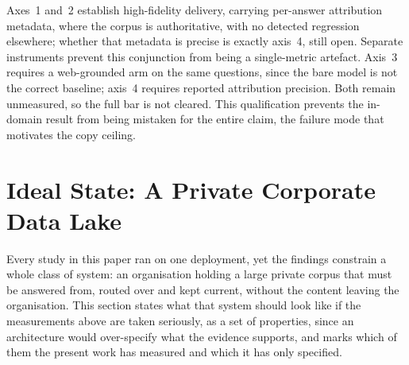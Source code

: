 \documentclass[10pt,twocolumn]{article}
\begin{document}
Axes~1 and~2 establish high-fidelity delivery, carrying per-answer attribution metadata, where the corpus is authoritative, with no detected regression elsewhere; whether that metadata is precise is exactly axis~4, still open. Separate instruments prevent this conjunction from being a single-metric artefact. Axis~3 requires a web-grounded arm on the same questions, since the bare model is not the correct baseline; axis~4 requires reported attribution precision. Both remain unmeasured, so the full bar is not cleared. This qualification prevents the in-domain result from being mistaken for the entire claim, the failure mode that motivates the copy ceiling.


\section{Ideal State: A Private Corporate Data Lake}\label{sec:datalake}
Every study in this paper ran on one deployment, yet the findings constrain a whole class of system: an organisation holding a large private corpus that must be answered from, routed over and kept current, without the content leaving the organisation. This section states what that system should look like if the measurements above are taken seriously, as a set of properties, since an architecture would over-specify what the evidence supports, and marks which of them the present work has measured and which it has only specified.
\end{document}

